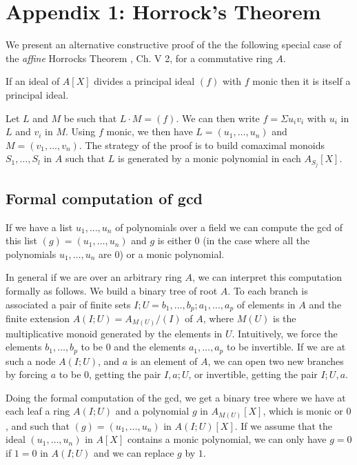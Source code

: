 \section*{Appendix 1: Horrock's Theorem}

We present an alternative constructive proof of the the following special case of the {\em affine}
Horrocks Theorem \cite{Lam}, Ch. V 2, for a commutative ring $A$. 

\begin{lemma}\label{Horrocks}
  If an ideal of $A[X]$ divides a principal ideal $(f)$ with $f$ monic then it is itself a principal ideal.
\end{lemma}

Let $L$ and $M$ be such that $L\cdot M = (f)$. We can then write $f = \Sigma u_iv_i$ with $u_i$ in $L$ and
$v_i$ in $M$. Using $f$ monic, we then have $L = (u_1,\dots,u_n)$ and $M = (v_1,\dots,v_n)$.
The strategy of the proof is to build comaximal monoids $S_1,\dots,S_l$ in $A$ \cite{lombardi-quitte} such
that $L$ is generated by a monic polynomial in each $A_{S_j}[X]$.

\subsection{Formal computation of gcd}


If we have a list $u_1,\dots,u_n$ of polynomials over a field we can compute the gcd of this list
$(g) = (u_1,\dots,u_n)$ and $g$ is either $0$ (in the case where all the polynomials $u_1,\dots,u_n$ are $0$)
or a monic polynomial.

In general if we are over an arbitrary ring $A$, we can interpret this computation formally as
follows. We build a binary tree of root $A$. 
To each branch is associated a pair of finite sets $I;U = b_1,\dots,b_p;a_1,\dots,a_p$
of elements in $A$ and the finite
extension $A(I;U) = A_{M(U)}/(I)$ of $A$, where $M(U)$ is the multiplicative monoid generated by the
elements in $U$. Intuitively, we force the elements $b_1,\dots,b_p$
to be $0$ and the elements $a_1,\dots,a_p$ to be invertible. If we are at such a node $A(I;U)$, and $a$ is
an element of $A$, we can open two new branches by forcing $a$ to be $0$, getting the pair $I,a;U$,
or invertible, getting the pair $I;U,a$.

Doing the formal computation of the gcd, we get a binary tree where we have at each leaf
a ring $A(I;U)$ and a polynomial $g$ in $A_{M(U)}[X]$, which is monic or $0$, and
such that $(g) = (u_1,\dots,u_n)$ in $A(I;U)[X]$. If we assume that the ideal $(u_1,\dots,u_n)$ in $A[X]$
contains a monic polynomial, we can only have $g = 0$ if $1=0$ in $A(I;U)$ and we can replace
$g$ by $1$.

